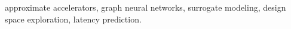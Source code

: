\documentclass[10pt,journal,letterpaper]{IEEEtran}
\begin{document}
\begin{IEEEkeywords}
approximate accelerators, graph neural networks, surrogate modeling, design space exploration, latency prediction.
\end{IEEEkeywords}









\FloatBarrier



\end{document}
